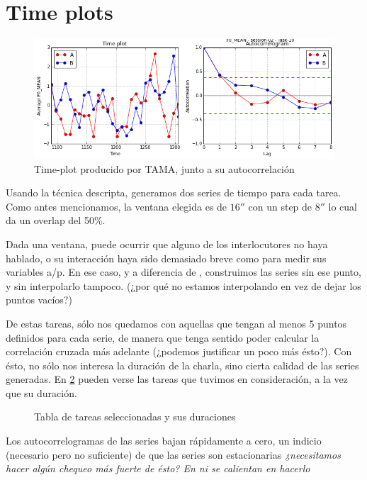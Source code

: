 \section{Time plots}

\begin{figure}
\centering
\includegraphics[width=15cm]{images/time_plot_with_autocorrelation.png}
\caption{Time-plot producido por TAMA, junto a su autocorrelación \label{time_plot}}

\end{figure}

Usando la técnica descripta, generamos dos series de tiempo para cada tarea. Como antes mencionamos, la ventana elegida es de $16''$ con un step de $8''$ lo cual da un overlap del 50\%.

Dada una ventana, puede ocurrir que alguno de los interlocutores no haya hablado, o su interacción haya sido demasiado breve como para medir sus variables a/p. En ese caso, y a diferencia de \cite{KOU2008}, construimos las series sin ese punto, y sin interpolarlo tampoco. (¿por qué no estamos interpolando en vez de dejar los puntos vacíos?)

De estas tareas, sólo nos quedamos con aquellas que tengan al menos 5 puntos definidos para cada serie, de manera que tenga sentido poder calcular la correlación cruzada más adelante (¿podemos justificar un poco más ésto?). Con ésto, no sólo nos interesa la duración de la charla, sino cierta calidad de las series generadas. En \ref{time_series_table} pueden verse las tareas que tuvimos en consideración, a la vez que su duración.

\begin{figure}
\centering

\label{time_series_table}
\caption{Tabla de tareas seleccionadas y sus duraciones}
\end{figure}

Los autocorrelogramas de las series bajan rápidamente a cero, un indicio (necesario pero no suficiente) de que las series son estacionarias \emph{¿necesitamos hacer algún chequeo más fuerte de ésto? En \cite{KOU2009} ni se calientan en hacerlo}

